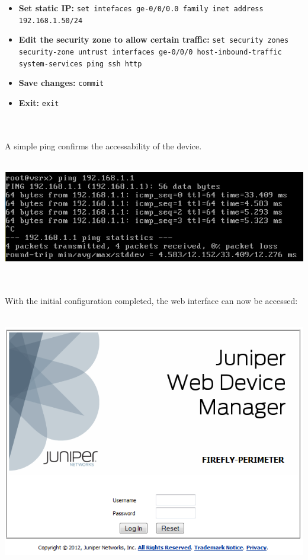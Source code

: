 \documentclass[11pt, a4paper]{article}
\begin{document}
\begin{itemize}
\begin{minipage}{\textwidth}
\end{minipage}
\begin{itemize}
\item \textbf{Set static IP:} \texttt{set intefaces ge-0/0/0.0 family inet address 192.168.1.50/24}
\item \textbf{Edit the security zone to allow certain traffic:} \texttt{set security zones security-zone untrust interfaces ge-0/0/0 host-inbound-traffic system-services ping ssh http}
\item \textbf{Save changes:} \texttt{commit}
\item \textbf{Exit:} \texttt{exit}
\end{itemize}
\end{itemize}
$\;$ \\ \\
A simple ping confirms the accessability of the device.
$\;$ \\ \\
\noindent\begin{minipage}{\textwidth}
    \centering
    \includegraphics[width=\textwidth]{Juniper_3.png}
\end{minipage}
$\;$ \\ \\
With the initial configuration completed, the web interface can now be accessed:
$\;$ \\ \\
\noindent\begin{minipage}{\textwidth}
    \centering
    \includegraphics[width=\textwidth]{Juniper_1.png}
\end{minipage}
\end{document}
